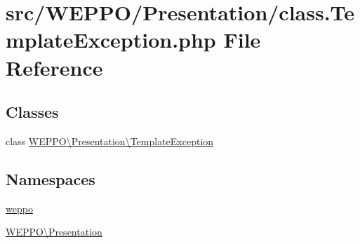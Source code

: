 \hypertarget{class_8TemplateException_8php}{}\section{src/\+W\+E\+P\+P\+O/\+Presentation/class.Template\+Exception.\+php File Reference}
\label{class_8TemplateException_8php}
\subsection*{Classes}
\begin{DoxyCompactItemize}
\item 
class \hyperlink{classWEPPO_1_1Presentation_1_1TemplateException}{W\+E\+P\+P\+O\textbackslash{}\+Presentation\textbackslash{}\+Template\+Exception}
\end{DoxyCompactItemize}
\subsection*{Namespaces}
\begin{DoxyCompactItemize}
\item 
 \hyperlink{namespaceweppo}{weppo}
\item 
 \hyperlink{namespaceWEPPO_1_1Presentation}{W\+E\+P\+P\+O\textbackslash{}\+Presentation}
\end{DoxyCompactItemize}
